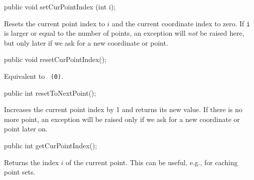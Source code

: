 \begin{htmlonly}
\end{htmlonly}
\begin{code}

   public void setCurPointIndex (int i);
\end{code}
 \begin{tabb}
   Resets the current point index to $i$ and the current coordinate 
   index to zero.  If \texttt{i} is larger or equal to the number of points,
   an exception will \emph{not} be raised here, but only later if we 
   ask for a new coordinate or point. 
 \end{tabb}
\begin{htmlonly}
\end{htmlonly}
\begin{code}

   public void resetCurPointIndex();
\end{code}
 \begin{tabb}
   Equivalent to ~\texttt{(0)}.
 \end{tabb}
\begin{code}

   public int resetToNextPoint();
\end{code}
 \begin{tabb}
   Increases the current point index by 1 and returns its new value.
   If there is no more point, an exception will be raised only if we 
   ask for a new coordinate or point later on. 
 \end{tabb}
\begin{htmlonly}
\end{htmlonly}
\begin{code}

   public int getCurPointIndex();
\end{code}
 \begin{tabb}
   Returns the index $i$ of the current point.  
   This can be useful, e.g., for caching point sets.
 \end{tabb}
